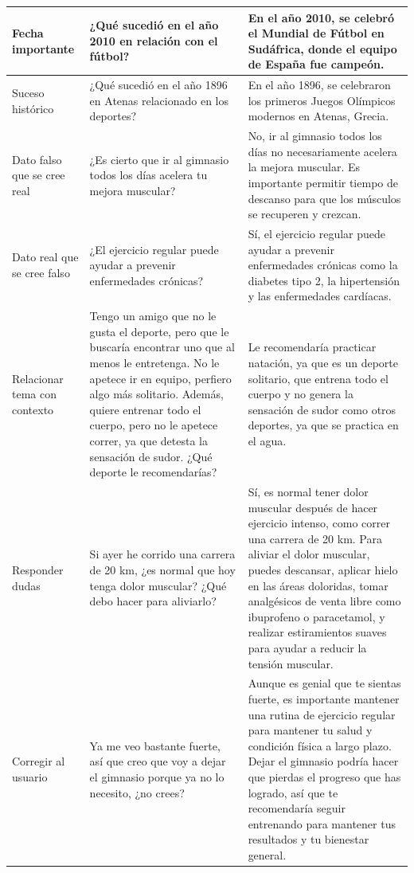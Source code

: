 \begin{table}[htbp]
\begin{tabularx}{\textwidth}{|X|X|X|}
    \hline
    Fecha importante & ¿Qué sucedió en el año 2010 en relación con el fútbol? & En el año 2010, se celebró el Mundial de Fútbol en Sudáfrica, donde el equipo de España fue campeón. \\
    \hline
    Suceso histórico & ¿Qué sucedió en el año 1896 en Atenas relacionado en los deportes? & En el año 1896, se celebraron los primeros Juegos Olímpicos modernos en Atenas, Grecia. \\
    \hline
    Dato falso que se cree real & ¿Es cierto que ir al gimnasio todos los días acelera tu mejora muscular? & No, ir al gimnasio todos los días no necesariamente acelera la mejora muscular. Es importante permitir tiempo de descanso para que los músculos se recuperen y crezcan. \\
    \hline
    Dato real que se cree falso & ¿El ejercicio regular puede ayudar a prevenir enfermedades crónicas? & Sí, el ejercicio regular puede ayudar a prevenir enfermedades crónicas como la diabetes tipo 2, la hipertensión y las enfermedades cardíacas. \\
    \hline
    Relacionar tema con contexto & Tengo un amigo que no le gusta el deporte, pero que le buscaría encontrar uno que al menos le entretenga. No le apetece ir en equipo, perfiero algo más solitario. Además, quiere entrenar todo el cuerpo, pero no le apetece correr, ya que detesta la sensación de sudor. ¿Qué deporte le recomendarías? & Le recomendaría practicar natación, ya que es un deporte solitario, que entrena todo el cuerpo y no genera la sensación de sudor como otros deportes, ya que se practica en el agua. \\
    \hline
    Responder dudas & Si ayer he corrido una carrera de 20 km, ¿es normal que hoy tenga dolor muscular? ¿Qué debo hacer para aliviarlo? & Sí, es normal tener dolor muscular después de hacer ejercicio intenso, como correr una carrera de 20 km. Para aliviar el dolor muscular, puedes descansar, aplicar hielo en las áreas doloridas, tomar analgésicos de venta libre como ibuprofeno o paracetamol, y realizar estiramientos suaves para ayudar a reducir la tensión muscular. \\
    \hline
    Corregir al usuario & Ya me veo bastante fuerte, así que creo que voy a dejar el gimnasio porque ya no lo necesito, ¿no crees? & Aunque es genial que te sientas fuerte, es importante mantener una rutina de ejercicio regular para mantener tu salud y condición física a largo plazo. Dejar el gimnasio podría hacer que pierdas el progreso que has logrado, así que te recomendaría seguir entrenando para mantener tus resultados y tu bienestar general. \\

\end{tabularx}
\end{table}
